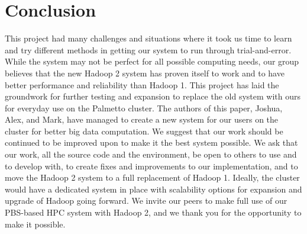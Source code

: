 \documentclass[conference]{IEEEtran}
\begin{document}
							\section{Conclusion}
			This project had many challenges and situations where it took us time to learn and try different methods in getting our system to run through trial-and-error. While the system may not be perfect for all possible computing needs, our group believes that the new Hadoop 2 system has proven itself to work and to have better performance and reliability than Hadoop 1. This project has laid the groundwork for further testing and expansion to replace the old system with ours for everyday use on the Palmetto cluster. The authors of this paper, Joshua, Alex, and Mark, have managed to create a new system for our users on the cluster for better big data computation. We suggest that our work should be continued to be improved upon to make it the best system possible. We ask that our work\cite{projectcode}, all the source code and the environment, be open to others to use and to develop with, to create fixes and improvements to our implementation, and to move the Hadoop 2 system to a full replacement of Hadoop 1. Ideally, the cluster would have a dedicated system in place with scalability options for expansion and upgrade of Hadoop going forward. We invite our peers to make full use of our PBS-based HPC system with Hadoop 2, and we thank you for the opportunity to make it possible.





\end{document}
